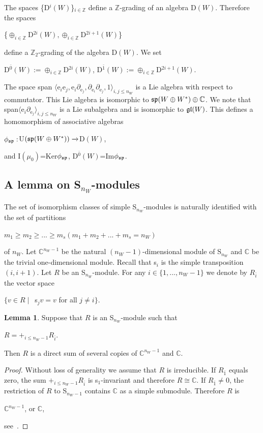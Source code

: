 \documentclass[12pt]{amsart}
\theoremstyle{definition}\newtheorem{theorem}{Theorem}[section]
\newtheorem{lemma}[proposition]{Lemma}
\theoremstyle{definition}\newtheorem{definition}[proposition]{Definition}
\theoremstyle{remark}\newtheorem{example}[proposition]{Example}
\renewcommand{\to}[1][]{\xrightarrow{#1}}
\begin{document}
The spaces \{D$^i(W)$\}$_{i\in\mathbb Z}$ define a $\mathbb Z$-grading of an algebra D$(W)$. Therefore the spaces \begin{center}\{$\oplus_{i\in\mathbb Z}$D$^{2i}(W), \oplus_{i\in\mathbb Z}$D$^{2i+1}(W)$\}\end{center} define a $\mathbb Z_{2}$-grading of the algebra D$(W)$. We set \begin{center}D$^{\bar 0}(W):=\oplus_{i\in\mathbb Z}$D$^{2i}(W)$,\hspace{10pt} D$^{\bar1}(W):=\oplus_{i\in\mathbb Z}$D$^{2i+1}(W)$.\end{center}
The space span $\langle$e$_i$e$_j, $e$_i\partial_{\mathrm e_j}, \partial_{\mathrm e_i}\partial_{\mathrm e_j}, 1\rangle_{i, j\le n_W}$ is a Lie algebra with respect to commutator. This Lie algebra is isomorphic to $\frak{sp}(W\oplus W^*)\oplus\mathbb C$. We note that span$\langle$e$_i\partial_{\mathrm e_j}\rangle_{i, j\le n_W}$ is a Lie subalgebra and is isomorphic to $\frak{gl}(W)$. This defines a homomorphism of associative algebras\begin{center}$\phi_\frak{sp}:$U$(\frak{sp}(W\oplus W^*))\to$D$(W)$,\end{center}and I$(\mu_0)$=Ker$\phi_\frak{sp}$, D$^{\bar0}(W)$=Im$\phi_\frak{sp}$.
\subsection{A lemma on S$_{n_W}$-modules}\label{SSsn} The set of isomorphism classes of simple S$_{n_W}$-modules is naturally identified with the set of partitions \begin{center}$m_1\ge m_2\ge ...\ge m_s (m_1+m_2+...+m_s=n_W)$\end{center} of $n_W$. Let $\mathbb C^{n_W-1}$ be the natural $(n_W-1)$-dimensional module of S$_{n_W}$ and $\mathbb C$ be the trivial one-dimensional module. Recall that s$_i$ is the simple transposition $(i, i+1)$. Let $R$ be an S$_{n_W}$-module. For any $i\in\{1,..., n_W-1\}$ we denote by $R_{\bar i}$ the vector space \begin{center}$\{v\in R\mid$~s$_jv=v$ for all $j\ne i\}$.\end{center}
\begin{lemma}\label{Lsn} Suppose that $R$ is an S$_{n_W}$-module such that \begin{center}$R=+_{i\le n_W-1}R_{\bar i}$.\end{center} Then $R$ is a direct sum of several copies of $\mathbb C^{n_W-1}$ and $\mathbb C$.\end{lemma}
\begin{proof} Without loss of generality we assume that $R$ is irreducible. If $R_{\bar 1}$ equals zero, the sum $+_{i\le n_W-1}R_{\bar i}$ is s$_1$-invariant and therefore $R\cong \mathbb C$. If $R_{\bar 1}\ne0$, the restriction of $R$ to S$_{n_W-1}$ contains $\mathbb C$ as a simple submodule. Therefore $R$ is \begin{center}$\mathbb C^{n_W-1}$, or $\mathbb C$,\end{center}see~\cite{FH}.\end{proof}
\end{document}
